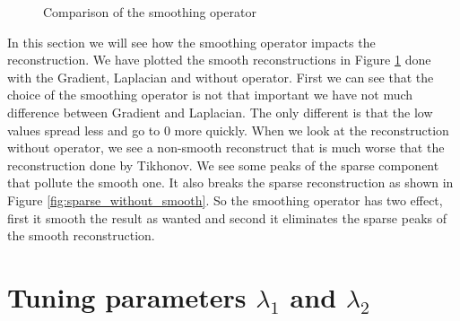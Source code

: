 \documentclass[a4paper,11pt,oneside]{report}
\theoremstyle{named}
\begin{document}
\begin{figure}
    \centering
    \caption{Comparison of the smoothing operator}
    \label{fig:smoothing}
\end{figure}

In this section we will see how the smoothing operator impacts the reconstruction. We have plotted the smooth reconstructions in Figure \ref{fig:smoothing} done with the Gradient, Laplacian and without operator. First we can see that the choice of the smoothing operator is not that important we have not much difference between Gradient and Laplacian. The only different is that the low values spread less and go to 0 more quickly. When we look at the reconstruction without operator, we see a non-smooth reconstruct that is much worse that the reconstruction done by Tikhonov. We see some peaks of the sparse component that pollute the smooth one. It also breaks the sparse reconstruction as shown in Figure \ref{fig:sparse_without_smooth}. So the smoothing operator has two effect, first it smooth the result as wanted and second it eliminates the sparse peaks of the smooth reconstruction.

\section{Tuning parameters $\lambda_1$ and $\lambda_2$} \label{Tuning parameters}
\end{document}
